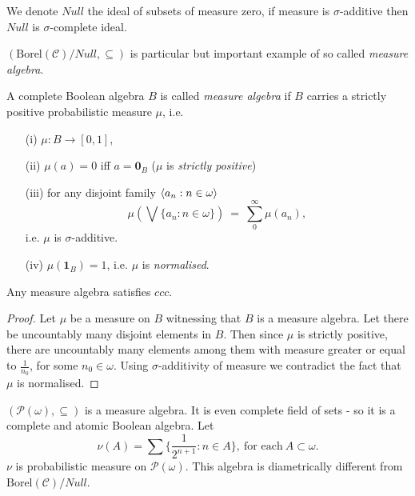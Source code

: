 We denote $Null$ the ideal of subsets of measure zero, if measure
is $\sigma$-additive then $Null$ is $\sigma$-complete ideal.



$(\mbox{Borel}(\mathcal C) / Null,\subseteq)$ is particular but important example of so
called \emph{measure algebra}.

\begin{definition}
 A complete Boolean algebra $B$ is called \emph{measure algebra} if $B$ carries
a strictly positive probabilistic measure $\mu$, i.e.
 \begin{itemize}
  \item[(i)] $\mu : B \to [0,1]$,
  \item[(ii)] $\mu(a) = 0$ iff $a = \mathbf 0_B$ ($\mu$ is \emph{strictly positive})
  \item[(iii)] for any disjoint family $\langle a_n : n \in \omega \rangle$
	$$
 	\mu(\bigvee \{a_n : n \in \omega \}) \ = \ \sum_0^\infty \mu(a_n),
	$$
	i.e. $\mu$ is $\sigma$-additive.
  \item[(iv)] $\mu(\mathbf 1_B) = 1$, i.e. $\mu$ is \emph{normalised}.
 \end{itemize}
\end{definition}

\begin{fact}
 Any measure algebra satisfies $ccc$.
\end{fact}

\begin{proof}
 Let $\mu$ be a measure on $B$ witnessing that $B$ is a measure algebra.
 Let there be uncountably many disjoint elements in $B$. Then since $\mu$ is
 strictly positive, there are uncountably
 many elements among them with measure greater or equal to $\frac{1}{n_0}$, for some
 $n_0 \in \omega$. Using $\sigma$-additivity of measure we contradict the fact
 that $\mu$ is normalised.
\end{proof}

\begin{example}
 $(\mathcal P(\omega),\subseteq)$ is a measure algebra. It is even complete field
 of sets - so it is a complete and atomic Boolean algebra. Let
$$
\nu(A) = \sum \{ \frac{1}{2^{n+1}} : n \in A \}, \ \mbox{for each} \ A \subset \omega.
$$
$\nu$ is probabilistic measure on $\mathcal P(\omega)$. This algebra is
diametrically different from $\mbox{Borel}(\mathcal C) / Null$.
\end{example}


